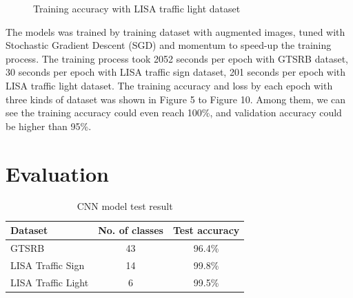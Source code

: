 \documentclass{article}
\begin{document}
\begin{figure}
\begin{minipage}{.42\textwidth}
    \caption{Training accuracy with LISA traffic light dataset}
    \label{fig:fig_11}
  \end{minipage}
\end{figure}
The models was trained by training dataset with augmented images, tuned with Stochastic Gradient Descent (SGD) and momentum to speed-up the training process. The training process took 2052 seconds per epoch with GTSRB dataset, 30 seconds per epoch with LISA traffic sign dataset, 201 seconds per epoch with LISA traffic light dataset. The training accuracy and loss by each epoch with three kinds of dataset was shown in Figure 5 to Figure 10. Among them, we can see the training accuracy could even reach 100\%, and validation accuracy could be higher than 95\%. 
\section{Evaluation}
\begin{table}
  \caption{CNN model test result}
  \label{table_1}
  \begin{center}
    \begin{tabular}{ | l | c | c |}
      \hline
      Dataset & No. of classes & Test accuracy \\ \hline
      GTSRB & 43 & 96.4\% \\ \hline
      LISA Traffic Sign & 14 & 99.8\% \\ \hline
      LISA Traffic Light & 6 & 99.5\% \\
      \hline
    \end{tabular}
  \end{center}
\end{table}
\end{document}
